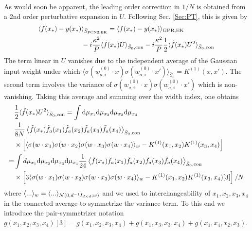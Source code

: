 As would soon be apparent, the leading order correction in $1/N$ is obtained from a 2nd order perturbative expansion in $U$. Following Sec. \ref{Sec:PT}, this is given by 
\begin{align}
\langle f(x_*) - y(x_*) &\rangle_{\bar{S}_{\text{FCN2,EK}}} = \langle f(x_*) - y(x_*)\rangle_{\text{GPR,EK}} \\ \nonumber &-i\frac{\kappa^2}{P} \langle \tilde{f}(x_*) U \rangle_{\bar{S}_0,\text{con}}-i\frac{\kappa^2}{P}\frac{1}{2}\langle \tilde{f}(x_*) U^2 \rangle_{\bar{S}_0,\text{con}} 
\end{align}
The term linear in $U$ vanishes due to the independent average of the Gaussian input weight under which $\langle \sigma({w}^{(0)}_{a,i} \cdot {x})\sigma({w}^{(0)}_{a,i} \cdot {x'})\rangle_{\bar{S}_0}=K^{(1)}(x,x')$. 
The second term involves the variance of $\sigma({w}^{(0)}_{a,i} \cdot {x})\sigma({w}^{(0)}_{a,i} \cdot {x'})$ which is non-vanishing. Taking this average and summing over the width index, one obtains  
\begin{align}
&\frac{1}{2}\langle \tilde{f}(x_*) U^2 \rangle_{\bar{S}_0,\text{con}} = \int \text{d}\mu_{x_1} \text{d}\mu_{x_2} \text{d}\mu_{x_3}\text{d}\mu_{x_4} \\ \nonumber & \frac{1}{8N}\left\langle \tilde{f}(x_*)   \tilde{f}_a(x_1) \tilde{f}_a(x_2) \tilde{f}_a(x_3) \tilde{f}_a(x_4)\right\rangle_{\bar{S}_0,\text{con}} \\ \nonumber 
& \times\left[\langle \sigma({w} \cdot {x_1}) \sigma({w} \cdot {x_2})\sigma({w} \cdot {x_3}) \sigma({w} \cdot {x_4}) \rangle_{w} -K^{(1)}(x_1,x_2)K^{(1)}(x_3,x_4)  \right]  \\ \nonumber 
=& \int d\mu_{x_1} \text{d}\mu_{x_2} \text{d}\mu_{x_3}\text{d}\mu_{x_4} \frac{1}{24}\left\langle \tilde{f}(x_*)   \tilde{f}_a(x_1) \tilde{f}_a(x_2) \tilde{f}_a(x_3) \tilde{f}_a(x_4)\right\rangle_{\bar{S}_0,\text{con}} \\ \nonumber 
& \times\left[3\langle \sigma({w} \cdot {x_1}) \sigma({w} \cdot {x_2})\sigma({w} \cdot {x_3}) \sigma({w} \cdot {x_4}) \rangle_{w} -K^{(1)}(x_1,x_2)K^{(1)}(x_3,x_4)[3]  \right]/N
\end{align}
where $\langle ... \rangle_w = \langle ... \rangle_{{\cal N}(0,d^{-1}I_{d\times d};w)}$ and we used to interchangeability of $x_1,x_2,x_3,x_4$ in the connected average to symmetrize the variance term. To this end we introduce the pair-symmetrizer notation  $g(x_1,x_2,x_3,x_4)[3]=g(x_1,x_2,x_3,x_4)+g(x_1,x_3,x_3,x_4)+g(x_1,x_4,x_2,x_3)$. 

